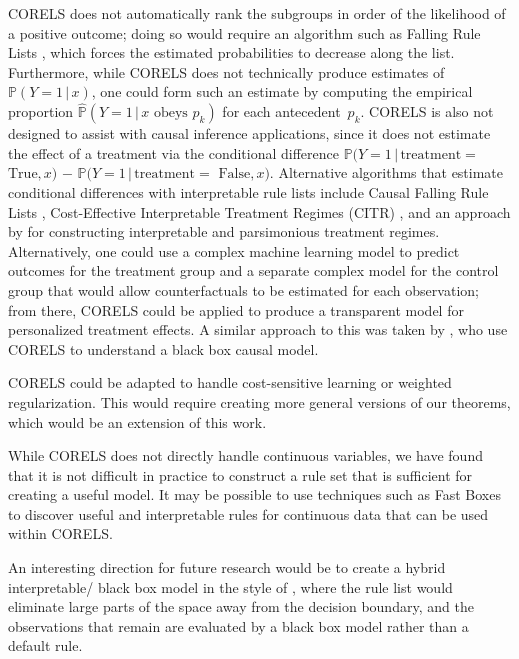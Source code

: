\documentclass[twoside,11pt]{article}
\def\P{\mathbb{P}}
\newcommand{\given}{\,|\,}
\begin{document}
\begin{arxiv}
CORELS does not automatically rank the subgroups in order of the likelihood of a
positive outcome; doing so would require an algorithm such as Falling Rule Lists \citep{WangRu15,ChenRu18}, which forces the estimated probabilities to decrease along the list.
%
Furthermore, while CORELS does not technically produce estimates of ${\P(Y=1 \given x)}$,
one could form such an estimate by computing the empirical
proportion ${\hat{\P}(Y=1 \given x \textrm{ obeys } p_k)}$ for each antecedent~$p_k$.
%
CORELS is also not designed to assist with causal inference applications, since
it does not estimate the effect of a treatment via the conditional difference
${\P(Y=1 \given \textrm{treatment} =}$ ${\textrm{True}, x)}$ $-$
${\P(Y=1 \given \textrm{treatment} =}$ ${\textrm{False}, x)}$.
%
Alternative algorithms that estimate conditional differences with interpretable
rule lists include Causal Falling Rule Lists \citep{WangRu15CFRL},
Cost-Effective Interpretable Treatment Regimes (CITR) \citep{LakkarajuRu17},
and an approach by \citet{ZhangEtAl15} for constructing
interpretable and parsimonious treatment regimes. Alternatively, one could use a complex machine learning model to predict outcomes for the treatment group and a separate complex model for the control group that would allow counterfactuals to be estimated for each observation; from there, CORELS could be applied to produce a transparent model for personalized treatment effects. A similar approach to this was taken by \citet{GohRu18causal}, who use CORELS to understand a black box causal model.
%

CORELS could be adapted to handle cost-sensitive learning or weighted regularization.
%
This would require creating more general versions of our theorems,
which would be an extension of this work.
%

While CORELS does not directly handle continuous variables, we have found that it is not difficult in practice to construct a rule set that is sufficient for creating a useful model. It may be possible to use techniques such as Fast Boxes \citep{GohRu14} to discover useful and interpretable rules for continuous data that can be used within CORELS.

An interesting direction for future research would be to create a hybrid interpretable/ black box model in the style of \citet{Wang2018}, where the rule list would eliminate large parts of the space away from the decision boundary, and the observations that remain are evaluated by a black box model rather than a default rule.



\end{arxiv}
\end{document}
